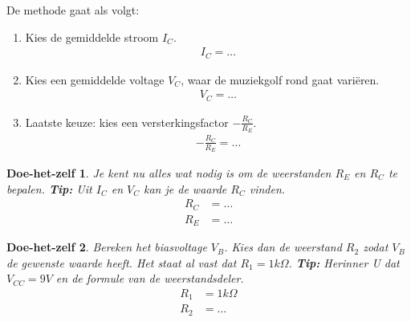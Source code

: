 \documentclass{article}
\newtheorem{DIY}{Doe-het-zelf}
\begin{document}
				De methode gaat als volgt:
				\begin{enumerate}
					\item Kies de gemiddelde stroom $I_C$.
					\begin{align}
					    I_C = \ldots
					\end{align}

					\item Kies een gemiddelde voltage $V_C$, waar de muziekgolf rond gaat vari\"eren.
					\begin{align}
					    V_C = \ldots
					\end{align}


					\item Laatste keuze: kies een versterkingsfactor $- \frac{R_C}{R_E}$.
					\begin{align}
					    -\frac{R_C}{R_E} = \ldots
					\end{align}
				\end{enumerate}


				\begin{DIY} Je kent nu alles wat nodig is om de weerstanden $R_{E}$ en $ R_{C}$ te bepalen. \textbf{Tip:} Uit $I_C$ en $V_C$ kan je de waarde $R_C$ vinden.
				\begin{align}
				    R_C &= \ldots \\
				    R_E &= \ldots
				\end{align}
\vspace{30ex}
				\end{DIY}				


				\begin{DIY} Bereken het biasvoltage $V_B$. Kies dan de weerstand $R_2$ zodat $V_B$ de gewenste waarde heeft. Het staat al vast dat $R_1 = 1k\Omega$. \textbf{Tip:} Herinner U dat $V_{CC} = 9V$ en de formule van de weerstandsdeler.
				\begin{align}
				    R_1 &= 1k\Omega \\
				    R_2 &= \ldots
				\end{align}
\vspace{50ex}
				\end{DIY}


				\begin{center}
					\noindent {}
				\end{center}
\end{document}
